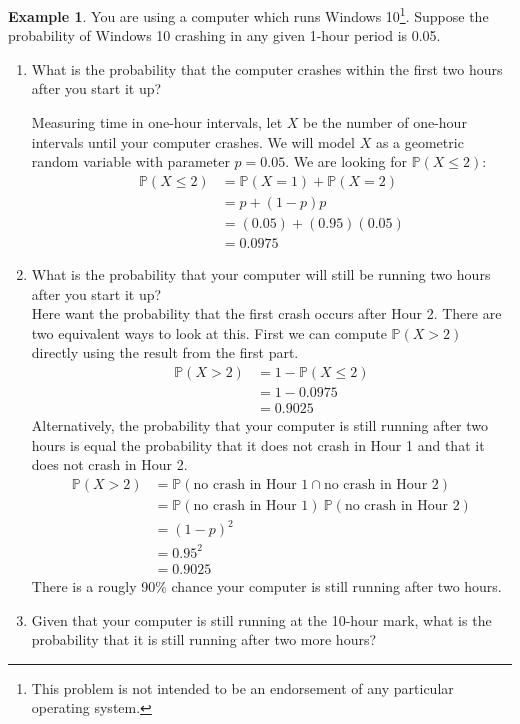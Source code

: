 \documentclass[12pt]{article}
\theoremstyle{definition}
\newtheorem*{example}{Example}
\theoremstyle{remark}
\def\P{{\mathbb P}}
\begin{document}
\begin{example}You are using a computer which runs Windows 10\footnote{This problem is not intended to be an endorsement of any particular operating system.}. Suppose the probability of Windows 10 crashing in any given 1-hour period is 0.05. 

\begin{enumerate}
\item What is the probability that the computer crashes within the first two hours after you start it up?

Measuring time in one-hour intervals, let $X$ be the number of one-hour intervals until your computer crashes. We will model $X$ as a geometric random variable with parameter $p = 0.05$. We are looking for $\P(X \leq 2)$:
\begin{align*}
\P(X \leq 2) &= \P(X = 1) + \P(X = 2) \\
&= p + (1-p)p \\
&= (0.05) + (0.95)(0.05) \\
&= 0.0975
\end{align*}

\item What is the probability that your computer will still be running two hours after you start it up?\\

Here want the probability that the first crash occurs after Hour 2. There are two equivalent ways to look at this. First we can compute $\P(X > 2)$ directly using the result from the first part.
\begin{align*}
\P(X > 2) &= 1 - \P(X \leq 2) \\
&= 1 - 0.0975 \\
&= 0.9025
\end{align*}
Alternatively, the probability that your computer is still running after two hours is equal the probability that it does not crash in Hour 1 and that it does not crash in Hour 2.
\begin{align*}
\P(X > 2) &= \P(\text{no crash in Hour 1} \cap \text{no crash in Hour 2} ) \\
&= \P(\text{no crash in Hour 1})\: \P(\text{no crash in Hour 2}) \\
&= (1-p)^2\\
&= 0.95^2\\
&= 0.9025
\end{align*}
There is a rougly 90\% chance your computer is still running after two hours. 

\item Given that your computer is still running at the 10-hour mark, what is the probability that it is still running after two more hours?\\


\end{enumerate}
\end{example}
\end{document}
